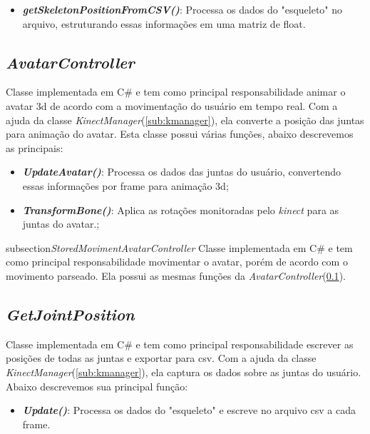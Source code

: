   \begin{itemize}
      \item \textit{\textbf{getSkeletonPositionFromCSV()}}: Processa os dados do "esqueleto" no arquivo, estruturando essas informações em uma matriz de float.
  \end{itemize}

\subsection{\textit{AvatarController}}\label{sub:avatarc}
  Classe implementada em C\# e tem como principal responsabilidade animar o avatar 3d de acordo com a movimentação do usuário em tempo real. Com a ajuda da classe \textit{KinectManager}(\ref{sub:kmanager}), ela
  converte a posição das juntas para animação do avatar. Esta classe possui várias funções, abaixo descrevemos as principais:

  \begin{itemize}
      \item \textit{\textbf{UpdateAvatar()}}: Processa os dados das juntas do usuário, convertendo essas informações por frame para animação 3d;
      \item \textit{\textbf{TransformBone()}}: Aplica as rotações monitoradas pelo \textit{kinect} para as juntas do avatar.;

  \end{itemize}

  subsection{\textit{StoredMovimentAvatarController}}\label{sub:storedavatarc}
    Classe implementada em C\# e tem como principal responsabilidade movimentar o avatar, porém de acordo com o movimento parseado. Ela possui as mesmas funções da
  \textit{AvatarController}(\ref{sub:avatarc}).

  \subsection{\textit{GetJointPosition}}\label{sub:getjoint}
    Classe implementada em C\# e tem como principal responsabilidade escrever as posições de todas as juntas e exportar para csv. Com a ajuda da classe \textit{KinectManager}(\ref{sub:kmanager}),
    ela captura os dados sobre as juntas do usuário. Abaixo descrevemos sua principal função:

    \begin{itemize}
        \item \textit{\textbf{Update()}}: Processa os dados do "esqueleto" e escreve no arquivo csv a cada frame.
    \end{itemize}

